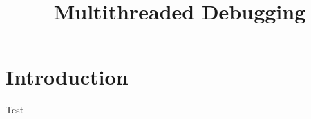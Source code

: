 \documentclass[conference]{IEEEtran}
\begin{document}
\title{Multithreaded Debugging}

\author{
}

\maketitle

\begin{abstract}
\end{abstract}

\begin{IEEEkeywords}
\end{IEEEkeywords}

\section{Introduction}
Test \cite{acm2002}



\end{document}
